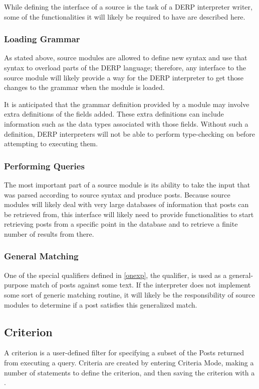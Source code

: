 While defining the interface of a source is the task of a DERP interpreter writer, some of the
functionalities it will likely be required to have are described here.

\subsubsection{Loading Grammar}
As stated above, source modules are allowed to define new syntax and use that syntax to overload parts
of the DERP language; therefore, any interface to the source module will likely provide a way for the
DERP interpreter to get those changes to the grammar when the module is loaded.

It is anticipated that the grammar definition provided by a module may involve extra definitions of
the fields added. These extra definitions can include information such as the data types associated
with those fields. Without such a definition, DERP interpreters will not be able to perform type-checking
on  before attempting to executing them.

\subsubsection{Performing Queries}
The most important part of a source module is its ability to take the input that was parsed according to
source syntax and produce posts. Because source modules will likely deal with very large databases of
information that posts can be retrieved from, this interface will likely need to provide functionalities
to start retrieving posts from a specific point in the database and to retrieve a finite number of results
from there.

\subsubsection{General Matching}%
One of the special qualifiers defined in \ref{onexp}, the  qualifier, is used as a general-purpose
match of posts against some text. If the interpreter does not implement some sort of generic matching
routine, it will likely be the responsibility of source modules to determine if a post satisfies this
generalized match.

\subsection{Criterion}
A criterion is a user-defined filter for specifying a subset of the Posts returned from executing a query.
Criteria are created by entering Criteria Mode, making a number of statements to define the criterion, and
then saving the criterion with a .

